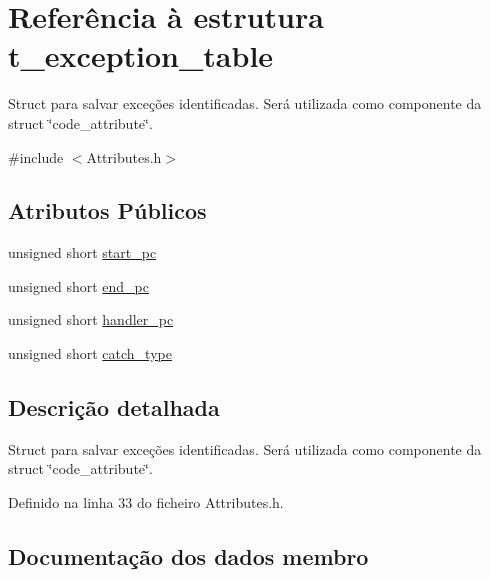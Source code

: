 \hypertarget{structt__exception__table}{}\section{Referência à estrutura t\+\_\+exception\+\_\+table}
\label{structt__exception__table}


Struct para salvar exceções identificadas. Será utilizada como componente da struct \char`\"{}code\+\_\+attribute\char`\"{}.  




{\ttfamily \#include $<$Attributes.\+h$>$}

\subsection*{Atributos Públicos}
\begin{DoxyCompactItemize}
\item 
unsigned short \hyperlink{structt__exception__table_a1e301f7924e5e2ebe75dbf5a4bb2b090}{start\+\_\+pc}
\item 
unsigned short \hyperlink{structt__exception__table_a0e650c1f5254b1163fb64c19524e45cf}{end\+\_\+pc}
\item 
unsigned short \hyperlink{structt__exception__table_adeddab7249cce7351d5f8387ccae0963}{handler\+\_\+pc}
\item 
unsigned short \hyperlink{structt__exception__table_a948e8861147a4c9ce9df40ca1f5cf680}{catch\+\_\+type}
\end{DoxyCompactItemize}


\subsection{Descrição detalhada}
Struct para salvar exceções identificadas. Será utilizada como componente da struct \char`\"{}code\+\_\+attribute\char`\"{}. 

Definido na linha 33 do ficheiro Attributes.\+h.



\subsection{Documentação dos dados membro}
\mbox{\label{structt__exception__table_a948e8861147a4c9ce9df40ca1f5cf680}} 
